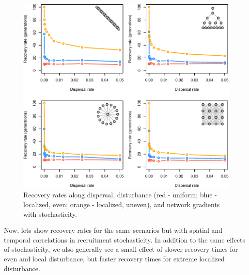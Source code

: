\documentclass[
]{article}
\begin{document}
\begin{figure}[H]

{\centering \includegraphics{Managing_for_ecological_surprises_in_metapopulations_files/figure-latex/stochastic recruitment-1} 

}

\caption{Recovery rates along dispersal, disturbance (red - uniform; blue - localized, even; orange - localized, uneven), and network gradients with stochasticity.}\label{fig:stochastic recruitment}
\end{figure}
\newpage

Now, lets show recovery rates for the same scenarios but with spatial
and temporal correlations in recruitment stochasticity. In addition to
the same effects of stochasticity, we also generally see a small effect
of slower recovery times for even and local disturbance, but faster
recovery times for extreme localized disturbance.
\end{document}
